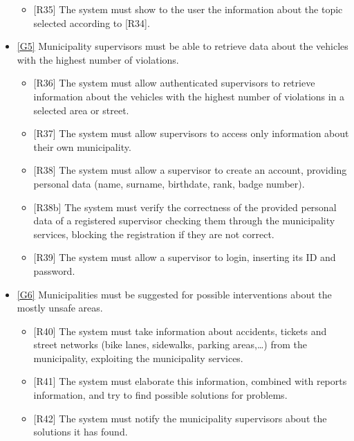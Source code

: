 \documentclass[a4paper]{report}
\begin{document}
\begin{itemize}
\begin{itemize}
\item {[R35]}	\label{R35}The system must show to the user the information about the topic selected according to [R34].
\end{itemize}
\item  \hyperref[G5]{[G5]} Municipality supervisors must be able to retrieve data about the vehicles with the highest number of violations.
\begin{itemize}
\item {[R36]}	\label{R36}The system must allow authenticated supervisors to retrieve information about the vehicles with the highest number of violations in a selected area or street.
\item {[R37]}	\label{R37}The system must allow supervisors to access only information about their own municipality.
\item {[R38]}	\label{R38}The system must allow a supervisor to create an account, providing personal data (name, surname, birthdate, rank, badge number).
\item {[R38b]}  \label{R38b}The system must verify the correctness of the provided personal data of a registered supervisor checking them through the municipality services, blocking the registration if they are not correct.
\item {[R39]}	\label{R39}The system must allow a supervisor to login, inserting its ID and password.
\end{itemize}
\item  \hyperref[G6]{[G6]} Municipalities must be suggested for possible interventions about the mostly unsafe areas.
\begin{itemize}
\item {[R40]}	\label{R40}The system must take information about accidents, tickets and street networks (bike lanes, sidewalks, parking areas,…) from the municipality, exploiting the municipality services.
\item {[R41]}	\label{R41}The system must elaborate this information, combined with reports information, and try to find possible solutions for problems.
\item {[R42]}	\label{R42}The system must notify the municipality supervisors about the solutions it has found.
\end{itemize}
\end{itemize}
\end{document}
